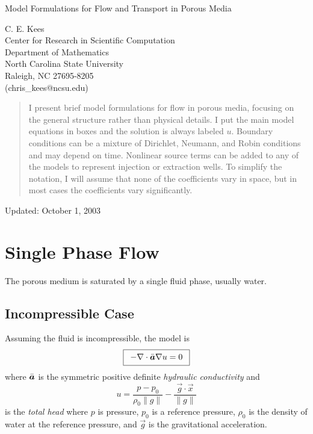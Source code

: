 \documentclass[12pt,dvips,letterpaper]{article}
\begin{document}
 

\newcommand{\R}{\mathbb{R}}
\newcommand{\framedEquation}[1]{\fbox{$ \begin{array}{rcl} #1 \end{array} $}}
\newcommand{\framedArray}[1]{\fbox{$ \begin{array}{rcl} #1 \end{array} $}}

\begin{center}
  Model Formulations for Flow and Transport in Porous Media
\end{center}
\begin{center} 
  C. E. Kees \\
  Center for Research in Scientific Computation \\
  Department of Mathematics \\
  North Carolina State University \\
  Raleigh, NC 27695-8205 \\
  (chris\_kees@ncsu.edu) \\
\end{center}
\begin{abstract}
  I present brief model formulations for flow in porous media,
  focusing on the general structure rather than physical details.
  I put the main model equations in boxes and the solution is
  always labeled $u$. Boundary conditions can be a mixture of
  Dirichlet, Neumann, and Robin conditions and may depend on time.
  Nonlinear source terms can be added to any of the models to
  represent injection or extraction wells. To simplify the notation, I
  will assume that none of the coefficients vary in space, but in most
  cases the coefficients vary significantly.
\end{abstract}
\begin{center}
  Updated: October 1, 2003 \\
\end{center}

\section{Single Phase Flow}

The porous medium is saturated by a single fluid phase, usually water.

\subsection{Incompressible Case}
Assuming the fluid is incompressible, the model is
\begin{equation}
\framedEquation{ - \deld  \ten{a} \grad u  = 0 }
\end{equation}
where $\bar{\mbox{{\boldmath ${a}$}}}$ is the symmetric positive definite {\em hydraulic conductivity} and
\begin{equation*}
u = \frac{p - p_0}{\rho_0 \| g\|} - \frac{\vec g \cdot \vec x}{\| g\|}
\end{equation*}
is the {\em total head} where $p$ is pressure, $p_0$ is a reference
pressure, $\rho_0$ is the density of water at the reference pressure, and $\vec g$ is the
gravitational acceleration.
\end{document}
